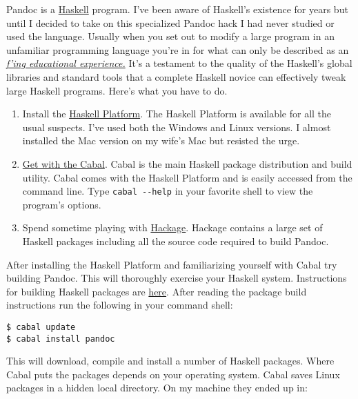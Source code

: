 Pandoc is a \href{http://www.haskell.org/haskellwiki/Haskell}{Haskell}
program. I've been aware of Haskell's existence for years but until I
decided to take on this specialized Pandoc hack I had never studied or
used the language. Usually when you set out to modify a large program in
an unfamiliar programming language you're in for what can only be
described as an \href{http://www.ebaumsworld.com/video/watch/81394604/}{\emph{f'ing educational experience.}} It's a testament to
the quality of the Haskell's global libraries and standard tools that a
complete Haskell novice can effectively tweak large Haskell programs.
Here's what you have to do.

\begin{enumerate}
\item
  Install the
  \href{http://hackage.haskell.org/platform/index.html}{Haskell
  Platform}. The Haskell Platform is available for all the usual
  suspects. I've used both the Windows and Linux versions. I almost
  installed the Mac version on my wife's Mac but resisted the urge.
\item
  \href{http://www.haskell.org/cabal/}{Get with the Cabal}. Cabal is the
  main Haskell package distribution and build utility. Cabal comes with
  the Haskell Platform and is easily accessed from the command line.
  Type \texttt{cabal -{}-help} in your favorite shell to view the
  program's options.
\item
  Spend sometime playing with
  \href{http://hackage.haskell.org/packages/hackage.html}{Hackage}.
  Hackage contains a large set of Haskell packages including all the
  source code required to build Pandoc.
\end{enumerate}

After installing the Haskell Platform and familiarizing yourself with
Cabal try building Pandoc. This will thoroughly exercise your Haskell
system. Instructions for building Haskell packages are
\href{http://www.haskell.org/haskellwiki/Cabal-Install}{here}. After
reading the package build instructions run the following in your command
shell:

\begin{verbatim}
$ cabal update
$ cabal install pandoc
\end{verbatim}

This will download, compile and install a number of Haskell packages.
Where Cabal puts the packages depends on your operating system. Cabal
saves Linux packages in a hidden local directory. On my machine they
ended up in:

